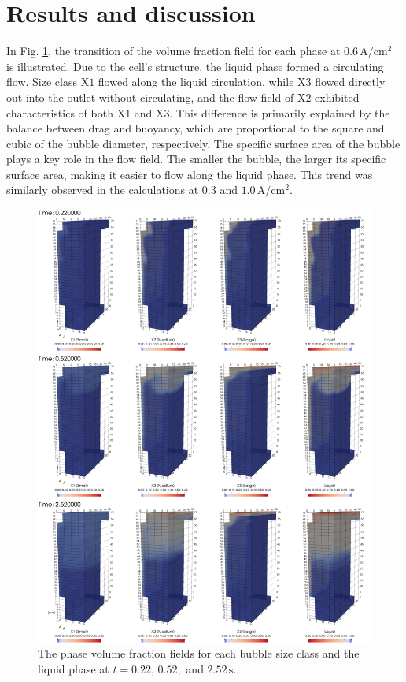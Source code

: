 \documentclass[3p, twocolumn, 10pt]{elsarticle}
\begin{document}
\section{Results and discussion}
In Fig. \ref{fig:06Alpha}, the transition of the volume fraction field for each phase at $0.6\,\mathrm{A/cm^2}$ is illustrated.
Due to the cell's structure, the liquid phase formed a circulating flow.
Size class $\mathrm{X1}$ flowed along the liquid circulation, while $\mathrm{X3}$ flowed directly out into the outlet without circulating, and the flow field of $\mathrm{X2}$ exhibited characteristics of both $\mathrm{X1}$ and $\mathrm{X3}$.
This difference is primarily explained by the balance between drag and buoyancy, which are proportional to the square and cubic of the bubble diameter, respectively.
The specific surface area of the bubble plays a key role in the flow field. The smaller the bubble, the larger its specific surface area, making it easier to flow along the liquid phase.
This trend was similarly observed in the calculations at $0.3$ and $1.0\,\mathrm{A/cm^2}$.
\begin{figure}[h]
  \centering
  \includegraphics[width=1\linewidth]{transition_06A.png}
  \caption{The phase volume fraction fields for each bubble size class and the liquid phase at $t=0.22,\,0.52,$ and $2.52\,\mathrm{s}$.}
  \label{fig:06Alpha}
\end{figure}
\end{document}
